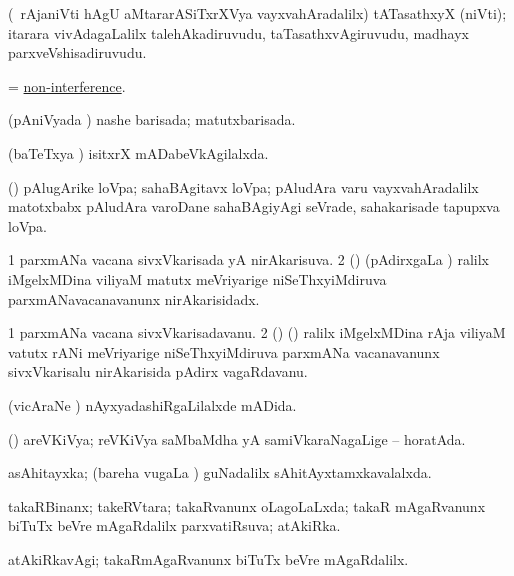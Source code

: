 \bentry
{}
\gl{\nA}
\bmng
(\kanmu\ rAjaniVti hAgU aMtararASiTxrXVya vayxvahAradalilx) tATasathxyX (niVti); itarara vivAdagaLalilx talehAkadiruvudu, taTasathxvAgiruvudu, madhayx parxveVshisadiruvudu. 
\emng
\eentry

\bentry
{}
\gl{\nA}
\bmng
= \hyperlink{non-interference}{non-interference}. 
\emng
\eentry

\bentry
{}
\gl{\gu}
\bmng
(pAniVyada \vi) nashe barisada; matutxbarisada. 
\emng
\eentry

\bentry
{}
\gl{\gu}
\bmng
(baTeTxya \vi) isitxrX mADabeVkAgilalxda. 
\emng
\eentry

\bentry
{}
\gl{\nA}
\bmng
(\nAyxshA) pAlugArike loVpa; sahaBAgitavx loVpa; pAludAra \mo varu vayxvahAradalilx matotxbabx pAludAra \mo varoDane sahaBAgiyAgi seVrade, sahakarisade tapupxva loVpa. 
\emng
\eentry

\bentry
{}
\gl{\gu}
\bmng
\bnum
\num{1} parxmANa vacana sivxVkarisada yA nirAkarisuva. 
\num{2} (\ca) (pAdirxgaLa \vi) ralilx iMgelxMDina viliyaM matutx meVriyarige niSeThxyiMdiruva parxmANavacanavanunx nirAkarisidadx. 
\enum
\emng
\eentry

\bentry
{}
\gl{\nA}
\bmng
\bnum
\num{1} parxmANa vacana sivxVkarisadavanu. 
\num{2} (\ca) (\kanmu) ralilx iMgelxMDina rAja viliyaM vatutx rANi meVriyarige niSeThxyiMdiruva parxmANa vacanavanunx sivxVkarisalu nirAkarisida pAdirx vagaRdavanu. 
\enum
\emng
\eentry

\bentry
{}
\gl{\gu}
\bmng
(vicAraNe \vi) nAyxyadashiRgaLilalxde mADida. 
\emng
\eentry

\bentry
{}
\gl{\gu}
\bmng
(\ga) areVKiVya; reVKiVya saMbaMdha yA samiVkaraNagaLige -- horatAda. 
\emng
\eentry

\bentry
{}
\gl{\gu}
\bmng
asAhitayxka; (bareha \mo vugaLa \vi) guNadalilx sAhitAyxtamxkavalalxda. 
\emng
\eentry

\bentry
{}
\gl{\gu}
\bmng
takaRBinanx; takeRVtara; takaRvanunx oLagoLaLxda; takaR mAgaRvanunx biTuTx beVre mAgaRdalilx parxvatiRsuva; atAkiRka. 
\emng
\eentry

\bentry
{}
\gl{\kirxvi}
\bmng
atAkiRkavAgi; takaRmAgaRvanunx biTuTx beVre mAgaRdalilx. 
\emng
\eentry

